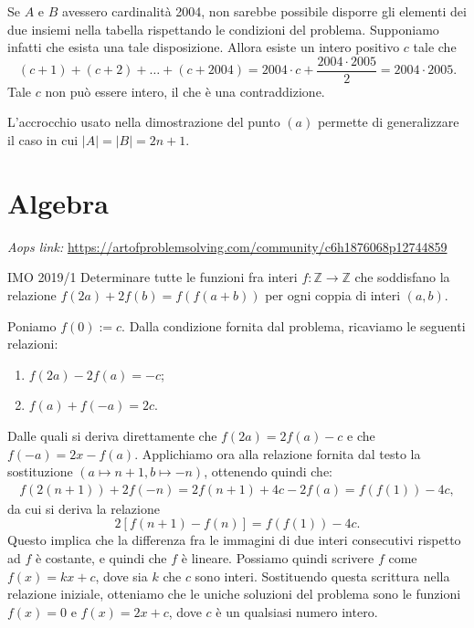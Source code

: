\documentclass{article}
\begin{document}
Se $A$ e $B$ avessero cardinalità 2004, non sarebbe possibile
disporre gli elementi dei due insiemi nella tabella rispettando le
condizioni del problema. Supponiamo infatti che esista una tale disposizione.
Allora esiste un intero positivo $c$ tale che
\begin{equation*}
	(c+1)+(c+2)+\dots+(c+2004)=2004\cdot c+\frac{2004\cdot 2005}{2}=2004\cdot 2005.
\end{equation*}
Tale $c$ non può essere intero, il che è una contraddizione.

\begin{remark*}{}{}
	L'accrocchio usato nella dimostrazione del punto $(a)$ permette
	di generalizzare il caso in cui $\vert A \vert=\vert B\vert=2n+1$.
\end{remark*}

\newpage

\section{Algebra}

\textit{Aops link:}
\href{https://artofproblemsolving.com/community/c6h1876068p12744859}
{https://artofproblemsolving.com/community/c6h1876068p12744859}

\begin{proposition}{IMO 2019/1}{}
	Determinare tutte le funzioni fra interi
	$f:\mathbb{Z}\rightarrow \mathbb{Z}$
	che soddisfano la relazione $f(2a)+2f(b)=f(f(a+b))$ per ogni coppia
	di interi $(a,b)$.
\end{proposition}

Poniamo $f(0):=c$.
Dalla condizione fornita dal problema, ricaviamo le seguenti relazioni:
\begin{enumerate}
	\item $f(2a)-2f(a)=-c$;
	\item $f(a)+f(-a)=2c$.
\end{enumerate}

Dalle quali si deriva direttamente che $f(2a)=2f(a)-c$ e che
$f(-a)=2x-f(a)$. Applichiamo ora alla relazione fornita dal
testo la sostituzione $(a\mapsto n+1,b\mapsto -n)$, ottenendo quindi che:
\begin{align*}
	f(2(n+1))+2f(-n)=2f(n+1)+4c-2f(a)
						 =f(f(1))-4c,
\end{align*}
da cui si deriva la relazione
\begin{equation*}
	2[f(n+1)-f(n)]=f(f(1))-4c.
\end{equation*}
Questo implica che la differenza fra le immagini di due interi
consecutivi rispetto ad $f$ è costante, e quindi che $f$ è lineare.
Possiamo quindi scrivere $f$ come $f(x)=kx+c$, dove sia $k$ che $c$
sono interi. Sostituendo questa scrittura nella relazione iniziale, 
otteniamo che le uniche soluzioni del problema sono le funzioni
$f(x)=0$ e $f(x)=2x+c$, dove $c$ è un qualsiasi numero intero.
\end{document}
